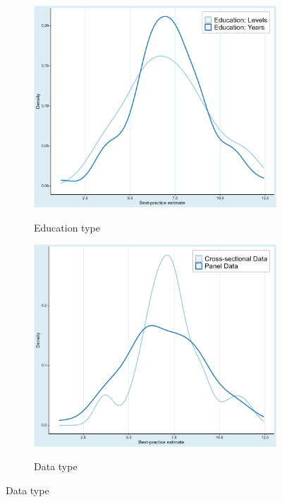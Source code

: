 \begin{figure}[!htbp]
\begin{center}
\caption{Implied best-practice across various subsets of data}
\label{fig:bpe_graphs}

\begin{subfigure}[!htbp]{0.38\textwidth}
   \vspace{-0.1cm}
   \caption{Education type}
   \vspace{-0.1cm}
   \includegraphics[width=0.95\linewidth]{Figures/BPE/bpe_years_levels.png}
   \label{fig:bpe_years_levels}
\end{subfigure}
\begin{subfigure}[!htbp]{0.38\textwidth}
   \vspace{-0.1cm}
   \caption{Data type}
   \vspace{-0.1cm}
   \includegraphics[width=0.95\linewidth]{Figures/BPE/bpe_data_type.png}
   \label{fig:bpe_data_type}
\end{subfigure}


\end{center}
\end{figure}
